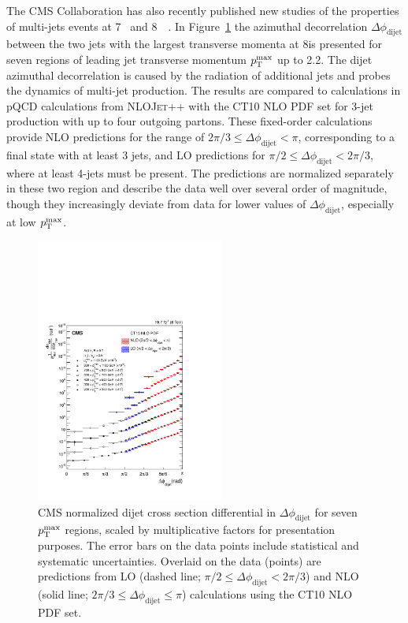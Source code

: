 \documentclass{PoS}
\providecommand{\NLOJETPP} {{\textsc{NLOJet++}}\xspace}
\def\as{\ensuremath{\alpha_\mathrm{S}}\xspace}
\providecommand{\dphi}{\ensuremath{\Delta\phi_\text{dijet}}\xspace}
\providecommand{\ptmax}{\ensuremath{\pt^{\text{max}}}\xspace}
\begin{document}
The CMS Collaboration has also recently published new studies of the properties of multi-jets events at 7\TeV~\cite{Khachatryan:2016udy, Khachatryan:2015xwa} and
8~\TeV~\cite{Khachatryan:2016hkr}. In Figure~\ref{fig:dijet} the azimuthal decorrelation $\dphi$ between the two jets with the largest transverse momenta at
8\TeV is presented for seven regions of leading jet transverse momentum \ptmax up to 2.2\TeV. The dijet azimuthal decorrelation is caused by
the radiation of additional jets and probes the dynamics of multi-jet production. The results are compared to calculations in
pQCD calculations from \NLOJETPP with the CT10 NLO PDF set for 3-jet production with up to four outgoing partons.
These fixed-order calculations provide NLO predictions for the range of
$2\pi/3 \leq \dphi < \pi$, corresponding to a final state with at least 3 jets, and LO predictions for $\pi/2 \leq \dphi <
2\pi/3$, where at least 4-jets must be present. The predictions are normalized separately in these two region and
describe the data well over several order of magnitude, though they increasingly deviate from data for lower values of
\dphi, especially at low \ptmax. 
\begin{figure}[hbtp]
  \centering
  \includegraphics[width=0.55\textwidth]{Figure7a.pdf}
  \caption{CMS normalized dijet cross section differential in \dphi for
    seven \ptmax regions, scaled by multiplicative factors for
    presentation purposes.  The error bars on the data points include
    statistical and systematic uncertainties. Overlaid on the data
    (points) are predictions from LO (dashed line; $\pi/2 \leq
    \dphi < 2\pi/3$) and NLO (solid line; $2\pi/3 \leq \dphi \leq
    \pi$) calculations using the CT10 NLO PDF set. 
}
  \label{fig:dijet}
\end{figure}
\end{document}
